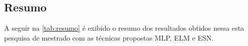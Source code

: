 \subsection{Resumo}

A seguir na \autoref{tab:resumo} é exibido o resumo dos resultados obtidos nessa esta pesquisa de mestrado com as técnicas propostas MLP, ELM e ESN.


%
%
%
